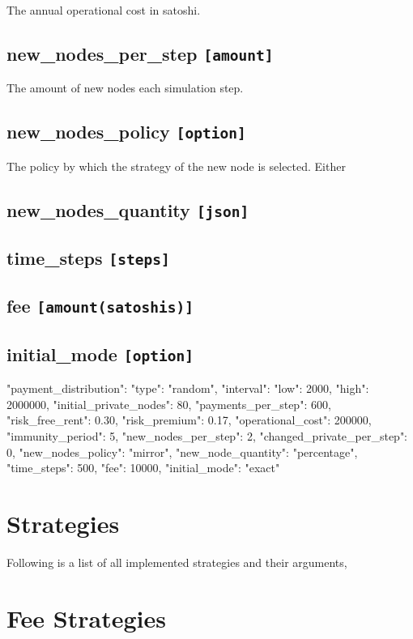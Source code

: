 The annual operational cost in satoshi.

\subsection*{new\_nodes\_per\_step \texttt{[amount]}}

The amount of new nodes each simulation step. 

\subsection*{new\_nodes\_policy \texttt{[option]}}

The policy by which the strategy of the new node is selected. Either 

\subsection*{new\_nodes\_quantity \texttt{[json]}}

\subsection*{time\_steps \texttt{[steps]}}

\subsection*{fee \texttt{[amount(satoshis)]}}

\subsection*{initial\_mode \texttt{[option]}}

"payment_distribution": {"type": "random", "interval": {"low": 2000, "high": 2000000}},
"initial_private_nodes": 80,
"payments_per_step": 600,
"risk_free_rent": 0.30,
"risk_premium": 0.17,
"operational_cost": 200000,
"immunity_period": 5,
"new_nodes_per_step": 2,
"changed_private_per_step": 0,
"new_nodes_policy": "mirror",
"new_node_quantity": "percentage",
"time_steps": 500,
"fee": 10000,
"initial_mode": "exact"


\section{Strategies}

Following is a list of all implemented strategies and their arguments, 

\section*{Fee Strategies}

